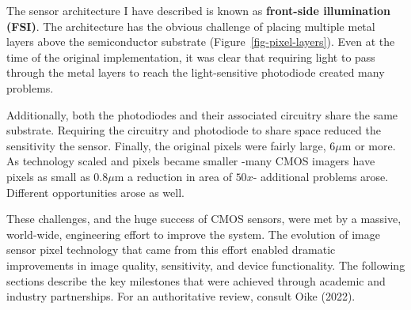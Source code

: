 \documentclass[
  letterpaper,
]{book}
\begin{document}
The sensor architecture I have described is known as \textbf{front-side
illumination (FSI)}. The architecture has the obvious challenge of
placing multiple metal layers above the semiconductor substrate
(Figure~\ref{fig-pixel-layers}). Even at the time of the original
implementation, it was clear that requiring light to pass through the
metal layers to reach the light-sensitive photodiode created many
problems.

Additionally, both the photodiodes and their associated circuitry share
the same substrate. Requiring the circuitry and photodiode to share
space reduced the sensitivity the sensor. Finally, the original pixels
were fairly large, \(6 \mu \text{m}\) or more. As technology scaled and
pixels became smaller -many CMOS imagers have pixels as small as
\(0.8 \mu \text{m}\) a reduction in area of \(50x\)- additional problems
arose. Different opportunities arose as well.

These challenges, and the huge success of CMOS sensors, were met by a
massive, world-wide, engineering effort to improve the system. The
evolution of image sensor pixel technology that came from this effort
enabled dramatic improvements in image quality, sensitivity, and device
functionality. The following sections describe the key milestones that
were achieved through academic and industry partnerships. For an
authoritative review, consult Oike (2022).
\end{document}
